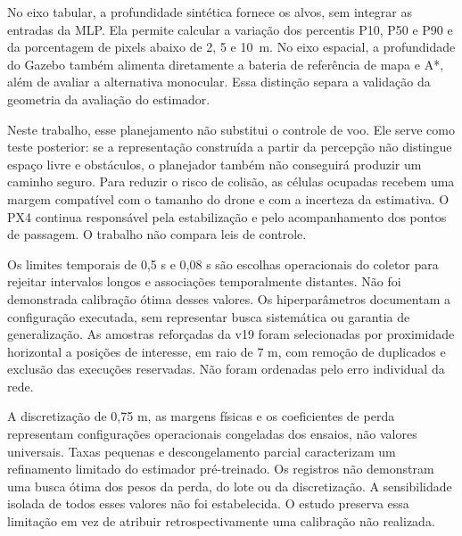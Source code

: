 No eixo tabular, a profundidade sintética fornece os alvos, sem integrar as entradas da MLP. Ela permite calcular a variação dos percentis P10, P50 e P90 e da porcentagem de pixels abaixo de 2, 5 e 10~m. No eixo espacial, a profundidade do Gazebo também alimenta diretamente a bateria de referência de mapa e A*, além de avaliar a alternativa monocular. Essa distinção separa a validação da geometria da avaliação do estimador.

Neste trabalho, esse planejamento não substitui o controle de voo. Ele serve como teste posterior: se a representação construída a partir da percepção não distingue espaço livre e obstáculos, o planejador também não conseguirá produzir um caminho seguro. Para reduzir o risco de colisão, as células ocupadas recebem uma margem compatível com o tamanho do drone e com a incerteza da estimativa. O PX4 continua responsável pela estabilização e pelo acompanhamento dos pontos de passagem. O trabalho não compara leis de controle.


Os limites temporais de 0,5 s e 0,08 s são escolhas operacionais do coletor para rejeitar intervalos longos e associações temporalmente distantes. Não foi demonstrada calibração ótima desses valores. Os hiperparâmetros documentam a configuração executada, sem representar busca sistemática ou garantia de generalização. As amostras reforçadas da v19 foram selecionadas por proximidade horizontal a posições de interesse, em raio de 7 m, com remoção de duplicados e exclusão das execuções reservadas. Não foram ordenadas pelo erro individual da rede.


A discretização de 0,75 m, as margens físicas e os coeficientes de perda representam configurações operacionais congeladas dos ensaios, não valores universais. Taxas pequenas e descongelamento parcial caracterizam um refinamento limitado do estimador pré-treinado. Os registros não demonstram uma busca ótima dos pesos da perda, do lote ou da discretização. A sensibilidade isolada de todos esses valores não foi estabelecida. O estudo preserva essa limitação em vez de atribuir retrospectivamente uma calibração não realizada.
